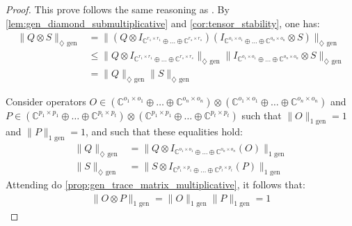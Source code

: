 \begin{proof}
  This prove follows the same reasoning as \cite[Proof of Theorem 3.49]{watrous2018theory}. By \autoref{lem:gen_diamond_submultiplicative} and \autoref{cor:tensor_stability}, one has:
  \begin{equation}
    \begin{split}
      \lVert Q \otimes S \rVert_{\diamondsuit \text{ gen}} & =  \lVert (Q \otimes I_{\mathbb{C}^{r_1 \times r_1} \oplus \ldots \oplus  \mathbb{C}^{r_s \times r_s}}) ( I_{\mathbb{C}^{o_1 \times o_1} \oplus \ldots \oplus \mathbb{C}^{o_n \times o_n}} \otimes S )\rVert_{\diamondsuit \text{ gen}} \\
      & \leq \lVert Q \otimes I_{\mathbb{C}^{r_1 \times r_1} \oplus \ldots \oplus  \mathbb{C}^{r_s \times r_s}}\rVert_{\diamondsuit \text{ gen}} \lVert  I_{\mathbb{C}^{o_1 \times o_1} \oplus \ldots \oplus \mathbb{C}^{o_n \times o_n}} \otimes S \rVert_{\diamondsuit \text{ gen}}   \\
      & = \lVert Q  \rVert_{\diamondsuit \text{ gen}} \lVert S \rVert_{\diamondsuit \text{ gen}}
    \end{split}
  \end{equation}

Consider operators $O \in (\mathbb{C}^{o_1 \times o_1} \oplus \ldots \oplus \mathbb{C}^{o_n \times o_n}) \otimes (\mathbb{C}^{o_1 \times o_1} \oplus \ldots \oplus \mathbb{C}^{o_n \times o_n})$ and $P \in  (\mathbb{C}^{p_1 \times p_1} \oplus \ldots \oplus  \mathbb{C}^{p_t \times p_t}) \otimes (\mathbb{C}^{p_1 \times p_1} \oplus \ldots \oplus  \mathbb{C}^{p_t \times p_t})$ such that $\lVert O \rVert_{1 \text{ gen}} = 1$ and $\lVert P \rVert_{1 \text{ gen}} = 1$, and such that these equalities hold:
\begin{equation} \label{eq:equalities_Q_S}
  \begin{split}
    \lVert Q  \rVert_{\diamondsuit \text{ gen}} & = \lVert Q \otimes I_{\mathbb{C}^{o_1 \times o_1} \oplus \ldots \oplus \mathbb{C}^{o_n \times o_n}}  (O) \rVert_{1 \text{ gen}} \\
    \lVert S  \rVert_{\diamondsuit \text{ gen}} & = \lVert S \otimes I_{\mathbb{C}^{p_1 \times p_1} \oplus \ldots \oplus \mathbb{C}^{p_t \times p_t}}  (P) \rVert_{1 \text{ gen}} 
  \end{split}
\end{equation}
Attending do \autoref{prop:gen_trace_matrix_multiplicative}, it follows that: 
\begin{equation} \label{eq:norm_o_times_p_equal_1}
  \begin{split}
    \lVert O \otimes P \rVert_{1 \text{ gen}} = \lVert O  \rVert_{1 \text{ gen}} \lVert P  \rVert_{1 \text{ gen}} =1
  \end{split}
\end{equation}


\end{proof}
